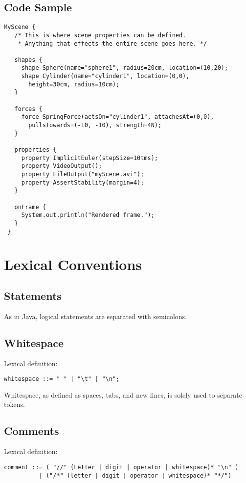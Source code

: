 \documentclass[letterpaper]{article}
\begin{document}
\subsection{Code Sample}

\begin{verbatim}
MyScene {
   /* This is where scene properties can be defined.
    * Anything that effects the entire scene goes here. */
   
   shapes {
     shape Sphere(name="sphere1", radius=20cm, location=(10,20);
     shape Cylinder(name="cylinder1", location=(0,0), 
       height=30cm, radius=10cm);
   }
   
   forces {
     force SpringForce(actsOn="cylinder1", attachesAt=(0,0), 
       pullsTowards=(-10, -10), strength=4N);
   }
   
   properties {
     property ImplicitEuler(stepSize=10tms);
     property VideoOutput();
     property FileOutput("myScene.avi");
     property AssertStability(margin=4);
   }

   onFrame {
     System.out.println("Rendered frame.");
   }
 }
\end{verbatim}

\section{Lexical Conventions}
 
\subsection{Statements}
As in Java, logical statements are separated with semicolons.
 
\subsection{Whitespace}
Lexical definition:

\begin{verbatim}
whitespace ::= " " | "\t" | "\n";
\end{verbatim}

Whitespace, as defined as spaces, tabs, and new lines, is solely used
to separate tokens.
 
\subsection{Comments}
Lexical definition:

\begin{verbatim}
comment ::= ( "//" (Letter | digit | operator | whitespace)* "\n" ) 
          | ("/*" (letter | digit | operator | whitespace)* "*/")
\end{verbatim}
\end{document}
